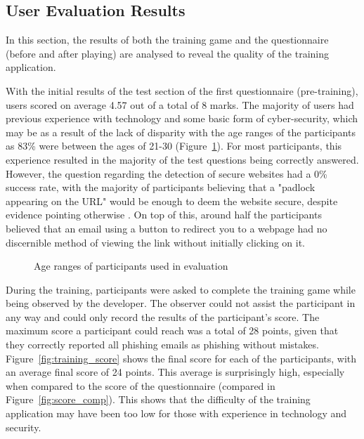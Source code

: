\documentclass{l4proj}
\begin{document}
\subsection{User Evaluation Results}
In this section, the results of both the training game and the questionnaire (before and after playing) are analysed to reveal the quality of the training application. 

With the initial results of the test section of the first questionnaire (pre-training), users scored on average 4.57 out of a total of 8 marks. The majority of users had previous experience with technology and some basic form of cyber-security, which may be as a result of the lack of disparity with the age ranges of the participants as 83\% were between the ages of 21-30 (Figure~\ref{fig:part_age_range}). For most participants, this experience resulted in the majority of the test questions being correctly answered. However, the question regarding the detection of secure websites had a 0\% success rate, with the majority of participants believing that a "padlock appearing on the URL" would be enough to deem the website secure, despite evidence pointing otherwise \citep{spadafora_2018}. On top of this, around half the participants believed that an email using a button to redirect you to a webpage had no discernible method of viewing the link without initially clicking on it.

\begin{figure}[H]
    \centering
    \caption{Age ranges of participants used in evaluation}
    \label{fig:part_age_range}
\end{figure}

During the training, participants were asked to complete the training game while being observed by the developer. The observer could not assist the participant in any way and could only record the results of the participant's score. The maximum score a participant could reach was a total of 28 points, given that they correctly reported all phishing emails as phishing without mistakes. Figure~\ref{fig:training_score} shows the final score for each of the participants, with an average final score of 24 points. This average is surprisingly high, especially when compared to the score of the questionnaire (compared in Figure~\ref{fig:score_comp}). This shows that the difficulty of the training application may have been too low for those with experience in technology and security.
\end{document}
